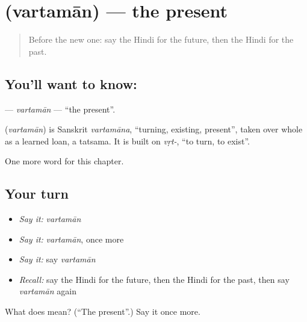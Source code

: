 \section[\texorpdfstring{\hi{वर्तमान} (vartamān)}{वर्तमान (vartamān)}]{ (vartamān) — the present}

\label{lesson:HI-C221-vartaman}



\begin{quote}
Before the new one: say the Hindi for the future, then the Hindi for the past.
\end{quote}

\subsection*{You'll want to know: }
\textbf{} — \emph{vartamān} — \textquotedblleft{}the present\textquotedblright{}.

\begin{cousinweb}
\textbf{} (\emph{vartamān}) is Sanskrit \emph{vartamāna}, \textquotedblleft{}turning, existing, present\textquotedblright{}, taken over whole as a learned loan, a tatsama. It is built on \emph{vṛt-}, \textquotedblleft{}to turn, to exist\textquotedblright{}.
\end{cousinweb}

\begin{grammarlens}[title={What you've built}]
One more word for this chapter.
\end{grammarlens}

\subsection*{Your turn}
\begin{itemize}
\raggedright
  \item \emph{Say it:} \emph{vartamān}
  \item \emph{Say it:} \emph{vartamān}, once more
  \item \emph{Say it:} say \emph{vartamān}
  \item \emph{Recall:} say the Hindi for the future, then the Hindi for the past, then say \emph{vartamān} again
\end{itemize}

\begin{tcolorbox}[breakable,colback=teal!4,colframe=teal!35!black,title={Before you move on}]
What does  mean? (\textquotedblleft{}The present\textquotedblright{}.) Say it once more.
\end{tcolorbox}
